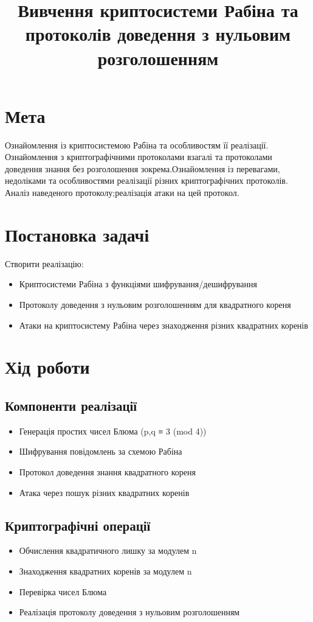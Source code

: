 \documentclass{article}
\title{Вивчення криптосистеми Рабіна та протоколів доведення з нульовим розголошенням}
\date{}
\begin{document}
\maketitle

\section{Мета}
Ознайомлення із криптосистемою Рабіна та особливостям її реалізації. Ознайомлення з криптографічними протоколами взагалі та протоколами доведення знання без розголошення зокрема.Ознайомлення із перевагами, недоліками та особливостями реалізації різних криптографічних протоколів. Аналіз наведеного протоколу;реалізація атаки на цей протокол.

\section{Постановка задачі}
Створити реалізацію:
\begin{itemize}
    \item Криптосистеми Рабіна з функціями шифрування/дешифрування
    \item Протоколу доведення з нульовим розголошенням для квадратного кореня
    \item Атаки на криптосистему Рабіна через знаходження різних квадратних коренів
\end{itemize}

\section{Хід роботи}

\subsection{Компоненти реалізації}
\begin{itemize}
    \item Генерація простих чисел Блюма (p,q ≡ 3 (mod 4))
    \item Шифрування повідомлень за схемою Рабіна
    \item Протокол доведення знання квадратного кореня
    \item Атака через пошук різних квадратних коренів
\end{itemize}

\subsection{Криптографічні операції}
\begin{itemize}
    \item Обчислення квадратичного лишку за модулем n
    \item Знаходження квадратних коренів за модулем n
    \item Перевірка чисел Блюма
    \item Реалізація протоколу доведення з нульовим розголошенням
\end{itemize}
\end{document}
